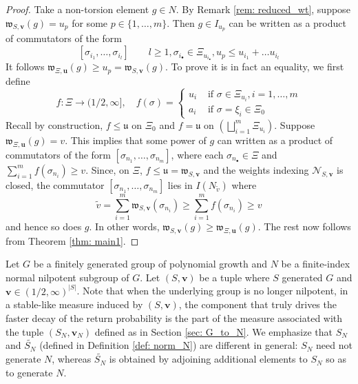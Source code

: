 \documentclass[pdflatex,sn-mathphys-num]{sn-jnl}%
\theoremstyle{thmstyleone}%
\theoremstyle{thmstyletwo}%
\theoremstyle{thmstylethree}%
\begin{document}
\begin{proof}
Take a non-torsion element $g \in N$.  By Remark \ref{rem: reduced_wt}, suppose
$\mathfrak{w}_{S,\mathbf{v}}(g) = u_{p}$ for some $p\in \{1,\ldots,m\}$. Then $g \in 
I_{u_p}$ can be written as a product of commutators of the form 
$$[\sigma_{i_1}, \ldots, \sigma_{i_l}] \qquad 
l\ge 1, \sigma_{i_\bullet} \in \Xi_{u_{i_\bullet}}, u_{p} \le u_{i_1} + \ldots u_{i_l} $$
It follows $\mathfrak{w}_{\Xi, \mathbf{u}}(g) \ge u_{p} =  \mathfrak{w}_{S,\mathbf{v}}(g) $.  To prove it is in fact an equality, we first define  
$$f: \Xi \to (1/2,\infty], \quad f(\sigma) = 
\begin{cases}
    u_{i} &\text{ if }\sigma \in \Xi_{u_i}, i =1,\ldots,m \\
    a_i &\text{ if } \sigma = \xi_i \in \Xi_0
\end{cases}$$
Recall by construction, $f \le \mathfrak{u}$ on 
$\Xi_0$ and $f =\mathfrak{u}$ on 
$\left(\bigsqcup_{i=1}^{m} \Xi_{u_i}\right)$. 
Suppose $\mathfrak{w}_{\Xi, \mathbf{u}}(g) = v$. This implies that some power of $g$ can written as a product of commutators of the form $[\sigma_{n_1},\ldots, \sigma_{n_m}]$, where each $\sigma_{n_\bullet} \in \Xi$  and 
 $\sum_{i=1}^m f(\sigma_{n_i}) \ge v$. 
 Since, on $\Xi$, 
 $f \le \mathfrak{u} = \mathfrak{w}_{S,\mathbf{v}}$ and the weights indexing $\mathcal{N}_{S,\mathbf{v}}$ is closed, 
 the commutator $[\sigma_{n_1},\ldots, \sigma_{n_m}]$ lies in $I(N_{\tilde{v}})$ where 
 $$\tilde{v} = \sum_{i=1}^m \mathfrak{w}_{S,\mathbf{v}}(\sigma_{n_i}) \ge \sum_{i=1}^m f(\sigma_{n_i}) \ge 
 v$$ and hence so does $g$. In other words, $\mathfrak{w}_{S, \mathbf{v}}(g) \ge  \mathfrak{w}_{\Xi, \mathbf{u}}(g)$. The rest now follows from Theorem \ref{thm: main1}. 
\end{proof}



Let $G$ be a finitely generated group of polynomial growth and $N$ be a finite-index normal nilpotent subgroup of $G$. Let $(S,\mathbf{v})$ be a tuple where $S$ generated $G$ and $\mathbf{v} \in (1/2, \infty)^{|S|}$. 
Note that when the underlying group is no longer nilpotent, in a stable-like measure induced by $(S,\mathbf{v})$, 
the component that truly drives the faster decay of the return probability is the part of the measure associated with the tuple  $(S_N, \mathbf{v}_N)$ defined as in Section \ref{sec: G_to_N}. We emphasize that $S_N$ and $\widetilde{S_N}$ (defined in Definition \ref{def: norm_N}) are different in general: $S_N$ need not generate $N$, whereas $\widetilde{S_N}$ is obtained by adjoining additional elements to $S_N$ so as to generate $N$. 
\end{document}
